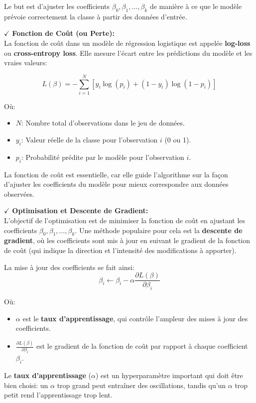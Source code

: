Le but est d’ajuster les coefficients \( \beta_0, \beta_1, \dots, \beta_k \) de manière à ce que le modèle prévoie correctement la classe à partir des données d'entrée.

\textbf{\(\checkmark\)} \textbf{Fonction de Coût (ou Perte):}\\
La fonction de coût dans un modèle de régression logistique est appelée \textbf{log-loss} ou \textbf{cross-entropy loss}. Elle mesure l’écart entre les prédictions du modèle et les vraies valeurs:

\[
L(\beta) = -\sum_{i=1}^{N} [y_i \log(p_i) + (1 - y_i) \log(1 - p_i)]
\]

Où:
\begin{itemize}
    \item \( N \): Nombre total d'observations dans le jeu de données.
    \item \( y_i \): Valeur réelle de la classe pour l'observation \( i \) (0 ou 1).
    \item \( p_i \): Probabilité prédite par le modèle pour l'observation \( i \).
\end{itemize}

La fonction de coût est essentielle, car elle guide l'algorithme sur la façon d'ajuster les coefficients du modèle pour mieux correspondre aux données observées.

\textbf{\(\checkmark\)} \textbf{Optimisation et Descente de Gradient:}\\
L’objectif de l’optimisation est de minimiser la fonction de coût en ajustant les coefficients \( \beta_0, \beta_1, \dots, \beta_k \). Une méthode populaire pour cela est la \textbf{descente de gradient}, où les coefficients sont mis à jour en suivant le gradient de la fonction de coût (qui indique la direction et l'intensité des modifications à apporter).

La mise à jour des coefficients se fait ainsi:
\[
\beta_i \leftarrow \beta_i - \alpha \frac{\partial L(\beta)}{\partial \beta_i}
\]

Où:
\begin{itemize}
    \item \( \alpha \) est le \textbf{taux d'apprentissage}, qui contrôle l'ampleur des mises à jour des coefficients.
    \item \( \frac{\partial L(\beta)}{\partial \beta_i} \) est le gradient de la fonction de coût par rapport à chaque coefficient \( \beta_i \).
\end{itemize}

Le \textbf{taux d'apprentissage} (\( \alpha \)) est un hyperparamètre important qui doit être bien choisi: un \( \alpha \) trop grand peut entraîner des oscillations, tandis qu'un \( \alpha \) trop petit rend l’apprentissage trop lent.
